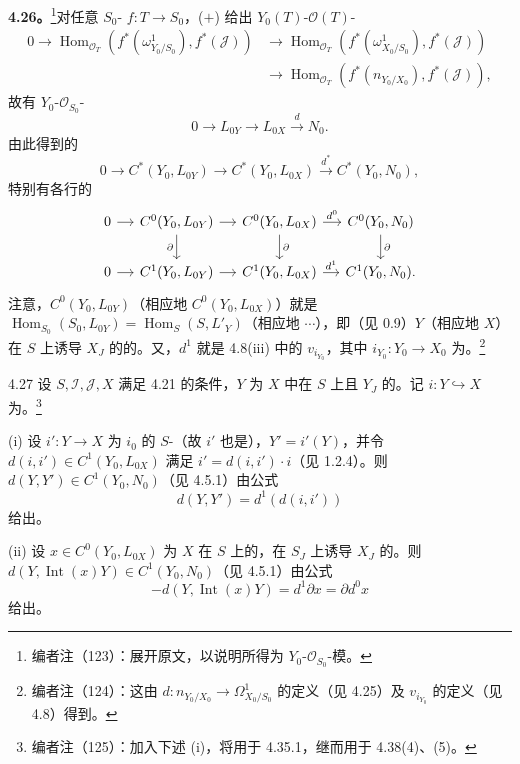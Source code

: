 \textbf{4.26。}\footnote{编者注（123）：展开原文，以说明所得为 $Y_0$-$\mathscr O_{S_0}$-模。}对任意 $S_0$- $f:T\to S_0$，($+$) 给出 $Y_0(T)$-$\mathscr O(T)$-
\[
\begin{aligned}
0\longrightarrow\operatorname{Hom}_{\mathscr O_T}(f^*(\omega^1_{Y_0/S_0}),f^*(\mathscr J))&\longrightarrow\operatorname{Hom}_{\mathscr O_T}(f^*(\omega^1_{X_0/S_0}),f^*(\mathscr J))\\
&\longrightarrow\operatorname{Hom}_{\mathscr O_T}(f^*(n_{Y_0/X_0}),f^*(\mathscr J)),
\end{aligned}
\]
故有 $Y_0$-$\mathscr O_{S_0}$-
\[0\longrightarrow L_{0Y}\longrightarrow L_{0X}\xrightarrow d N_0.\tag{4.26.1}\]
由此得到的
\[0\longrightarrow C^*(Y_0,L_{0Y})\longrightarrow C^*(Y_0,L_{0X})\xrightarrow{d^*}C^*(Y_0,N_0),\]
特别有各行的
\[
\begin{tikzcd}[column sep=small]
0\arrow[r]&C^0(Y_0,L_{0Y})\arrow[r]\arrow[d,"\partial"']&C^0(Y_0,L_{0X})\arrow[r,"d^0"]\arrow[d,"\partial"]&C^0(Y_0,N_0)\arrow[d,"\partial"]\\
0\arrow[r]&C^1(Y_0,L_{0Y})\arrow[r]&C^1(Y_0,L_{0X})\arrow[r,"d^1"]&C^1(Y_0,N_0).
\end{tikzcd}
\]
注意，$C^0(Y_0,L_{0Y})$（相应地 $C^0(Y_0,L_{0X})$）就是 $\operatorname{Hom}_{S_0}(S_0,L_{0Y})=\operatorname{Hom}_S(S,L'_Y)$（相应地 $\cdots$），即（见 0.9）$Y$（相应地 $X$）在 $S$ 上诱导 $X_J$ 的的。又，$d^1$ 就是 4.8(iii) 中的 $v_{i_{Y_0}}$，其中 $i_{Y_0}:Y_0\to X_0$ 为。\footnote{编者注（124）：这由 $d:n_{Y_0/X_0}\to\Omega^1_{X_0/S_0}$ 的定义（见 4.25）及 $v_{i_{Y_0}}$ 的定义（见 4.8）得到。}
\begin{SGAresult}{}{4.27}
设 $S,\mathscr I,\mathscr J,X$ 满足 4.21 的条件，$Y$ 为 $X$ 中在 $S$ 上且 $Y_J$ 的。记 $i:Y\hookrightarrow X$ 为。\footnote{编者注（125）：加入下述 (i)，将用于 4.35.1，继而用于 4.38(4)、(5)。}

(i) 设 $i':Y\to X$ 为 $i_0$ 的 $S$-（故 $i'$ 也是），$Y'=i'(Y)$，并令 $d(i,i')\in C^1(Y_0,L_{0X})$ 满足 $i'=d(i,i')\cdot i$（见 1.2.4）。则 $d(Y,Y')\in C^1(Y_0,N_0)$（见 4.5.1）由公式
\[d(Y,Y')=d^1(d(i,i'))\]
给出。

(ii) 设 $x\in C^0(Y_0,L_{0X})$ 为 $X$ 在 $S$ 上的，在 $S_J$ 上诱导 $X_J$ 的。则 $d(Y,\operatorname{Int}(x)Y)\in C^1(Y_0,N_0)$（见 4.5.1）由公式
\[-d(Y,\operatorname{Int}(x)Y)=d^1\partial x=\partial d^0x\]
给出。
\end{SGAresult}
